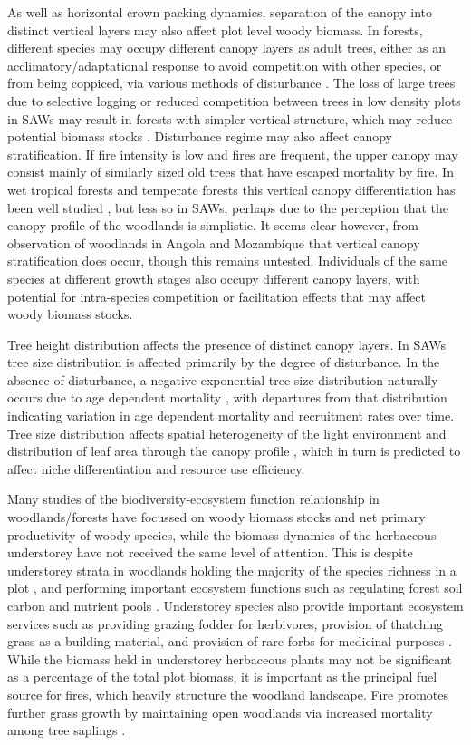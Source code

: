 \documentclass[11pt,a4paper]{article}
\begin{document}
As well as horizontal crown packing dynamics, separation of the canopy into distinct vertical layers may also affect plot level woody biomass. In forests, different species may occupy different canopy layers as adult trees, either as an acclimatory/adaptational response to avoid competition with other species, or from being coppiced, via various methods of disturbance \citep{Syampungani2017}. The loss of large trees due to selective logging or reduced competition between trees in low density plots in SAWs may result in forests with simpler vertical structure, which may reduce potential biomass stocks \citep{Mograbi2015}. Disturbance regime may also affect canopy stratification. If fire intensity is low and fires are frequent, the upper canopy may consist mainly of similarly sized old trees that have escaped mortality by fire. In wet tropical forests and temperate forests this vertical canopy differentiation has been well studied \citep{Lowman2004} \citep{Trofymow1998}, but less so in SAWs, perhaps due to the perception that the canopy profile of the woodlands is simplistic. It seems clear however, from observation of woodlands in Angola and Mozambique that vertical canopy stratification does occur, though this remains untested. Individuals of the same species at different growth stages also occupy different canopy layers, with potential for intra-species competition or facilitation effects that may affect woody biomass stocks.

Tree height distribution affects the presence of distinct canopy layers. In SAWs tree size distribution is affected primarily by the degree of disturbance. In the absence of disturbance, a negative exponential tree size distribution naturally occurs due to age dependent mortality \citep{Lehmann2009, Rubin2006}, with departures from that distribution indicating variation in age dependent mortality and recruitment rates over time. Tree size distribution affects spatial heterogeneity of the light environment and distribution of leaf area through the canopy profile \citep{Stark2015}, which in turn is predicted to affect niche differentiation and resource use efficiency. 

Many studies of the biodiversity-ecosystem function relationship in woodlands/forests have focussed on woody biomass stocks and net primary productivity of woody species, while the biomass dynamics of the herbaceous understorey have not received the same level of attention. This is despite understorey strata in woodlands holding the majority of the species richness in a plot \citep{Frost1996}, and performing important ecosystem functions such as regulating forest soil carbon and nutrient pools \citep{Gilliam2007, Nilsson2005}. Understorey species also provide important ecosystem services such as providing grazing fodder for herbivores, provision of thatching grass as a building material, and provision of rare forbs for medicinal purposes \citep{Ryan2016c}. While the biomass held in understorey herbaceous plants may not be significant as a percentage of the total plot biomass, it is important as the principal fuel source for fires, which heavily structure the woodland landscape. Fire promotes further grass growth by maintaining open woodlands via increased mortality among tree saplings \citep{Higgins2007, Hoffmann2012}. 
\end{document}
